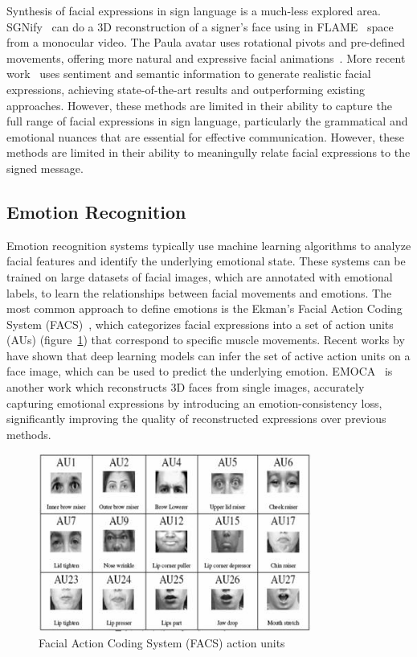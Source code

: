 \documentclass[../../main.tex]{subfiles}
\begin{document}
Synthesis of facial expressions in sign language is a much-less explored area. SGNify~\cite{Forte_2023_CVPR} can do a 3D reconstruction of a signer's face using in FLAME~\cite{FLAME} space from a monocular video. The Paula avatar uses rotational pivots and pre-defined movements, offering more natural and expressive facial animations~\cite{johnson-2022-improved}. More recent work~\cite{azevedo2024empowering} uses sentiment and semantic information to generate realistic facial expressions, achieving state-of-the-art results and outperforming existing approaches. However, these methods are limited in their ability to capture the full range of facial expressions in sign language, particularly the grammatical and emotional nuances that are essential for effective communication. However, these methods are limited in their ability to meaningully relate facial expressions to the signed message.

\subsection{Emotion Recognition}
\label{ch:facial_expressions:related_work:emotion_recognition}

Emotion recognition systems typically use machine learning algorithms to analyze facial features and identify the underlying emotional state. These systems can be trained on large datasets of facial images, which are annotated with emotional labels, to learn the relationships between facial movements and emotions. The most common approach to define emotions is the Ekman's Facial Action Coding System (FACS)~\cite{ekman1978facial}, which categorizes facial expressions into a set of action units (AUs) (figure~\ref{ch:facial_expressions:fig:action_units})  that correspond to specific muscle movements. Recent works by~\cite{luo2022learning} have shown that deep learning models can infer the set of active action units on a face image, which can be used to predict the underlying emotion. EMOCA~\cite{danvevcek2022emoca} is another work which reconstructs 3D faces from single images, accurately capturing emotional expressions by introducing an emotion-consistency loss, significantly improving the quality of reconstructed expressions over previous methods.

\begin{figure}
    \centering
    \includegraphics[width=0.8\textwidth]{chapters/facial_expressions/images/action_units.jpg}
    \caption{Facial Action Coding System (FACS) action units}
    \label{ch:facial_expressions:fig:action_units}
\end{figure}
\end{document}
